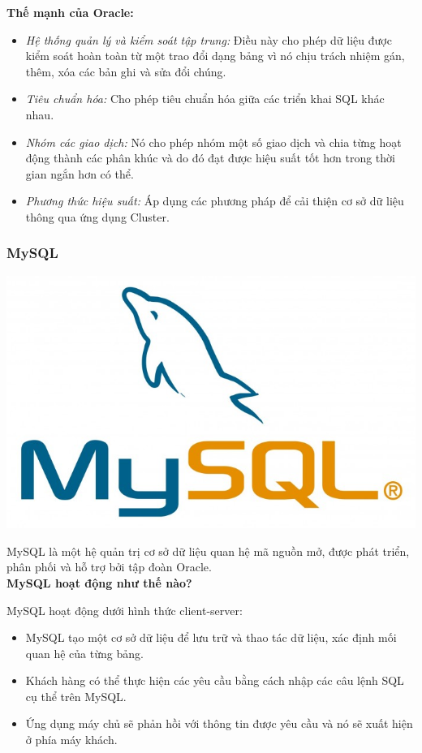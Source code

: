 \textbf{Thế mạnh của Oracle:}
\begin{itemize}
    \item \textit{Hệ thống quản lý và kiểm soát tập trung:} Điều này cho phép dữ liệu được kiểm soát hoàn toàn từ một trao đổi dạng bảng vì nó chịu trách nhiệm gán, thêm, xóa các bản ghi và sửa đổi chúng.
    \item \textit{Tiêu chuẩn hóa:} Cho phép tiêu chuẩn hóa giữa các triển khai SQL khác nhau.
    \item \textit{Nhóm các giao dịch:} Nó cho phép nhóm một số giao dịch và chia từng hoạt động thành các phân khúc và do đó đạt được hiệu suất tốt hơn trong thời gian ngắn hơn có thể.
    \item \textit{Phương thức hiệu suất:} Áp dụng các phương pháp để cải thiện cơ sở dữ liệu thông qua ứng dụng Cluster.
\end{itemize}
\subsubsection{MySQL}
\begin{center}
  \captionsetup{type=figure}
    \includegraphics[scale=0.5]{img/mysql.jpg}
\end{center}

MySQL là một hệ quản trị cơ sở dữ liệu quan hệ mã nguồn mở, được phát triển, phân phối và hỗ trợ bởi tập đoàn Oracle.\\

\textbf{MySQL hoạt động như thế nào?}

MySQL hoạt động dưới hình thức client-server:
\begin{itemize}
    \item MySQL tạo một cơ sở dữ liệu để lưu trữ và thao tác dữ liệu, xác định mối quan hệ của từng bảng.
    \item Khách hàng có thể thực hiện các yêu cầu bằng cách nhập các câu lệnh SQL cụ thể trên MySQL.
    \item Ứng dụng máy chủ sẽ phản hồi với thông tin được yêu cầu và nó sẽ xuất hiện ở phía máy khách.
\end{itemize}


